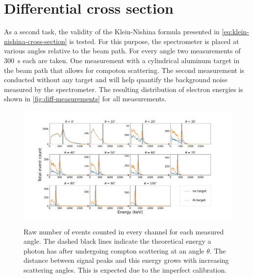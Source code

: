 
\section{Differential cross section}
\label{sec:differential-cross-section}

As a second task, the validity of the Klein-Nishina formula presented in
\autoref{eq:klein-nishina-cross-section} is tested. For this purpose, the
spectrometer is placed at various angles relative to the beam path. For every angle
two measurements of \SI{300}{\second} each are taken. One measurement with a
cylindrical aluminum target in the beam path that allows for compoton scattering.
The second measurement is conducted without any target and will help quantify the
background noise measured by the spectrometer. The resulting distribution of
electron energies is shown in \autoref{fig:diff-measurements} for all measurements.

\begin{figure}
  \includegraphics[width=1.0\textwidth]{./fig/differential measurements.png}
  \caption{}{Raw number of events counted in every channel for each measured angle.
  The dashed black lines indicate the theoretical energy a photon has after
  undergoing compton scattering at an angle $\theta$. The distance between signal
  peaks and this energy grows with increasing scattering angles. This is expected
  due to the imperfect calibration.}\label{fig:diff-measurements}
\end{figure}
